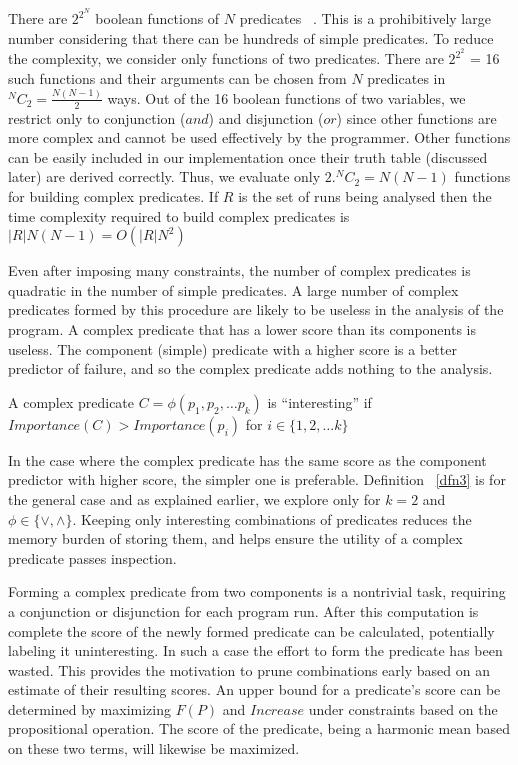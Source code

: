 There are $2^{2^N}$ boolean functions of $N$ predicates ~\cite{MathWorld:BoolFuncs}.  This is a prohibitively large number considering that there can be hundreds of simple predicates.  To reduce the complexity, we consider only functions of two predicates.  There are $2^{2^2}$ = 16 such functions and their arguments can be chosen from $N$ predicates in $^NC_2 = \frac{N(N-1)}{2}$ ways.  Out of the 16 boolean functions of two variables, we restrict only to conjunction ($and$) and disjunction ($or$) since other functions are more complex and cannot be used effectively by the programmer.  Other functions can be easily included in our implementation once their truth table (discussed later) are derived correctly.  Thus, we evaluate only $2. ^NC_2 = N(N-1)$ functions for building complex predicates.  If $R$ is the set of runs being analysed then the time complexity required to build complex predicates is $|R|N(N-1) = O(|R|N^2)$

Even after imposing many constraints, the number of complex predicates is quadratic in the number of simple predicates.  A large number of complex predicates formed by this procedure are likely to be useless in the analysis of the program.  A complex predicate that has a lower score than its components is useless.  The component (simple) predicate with a higher score is a better predictor of failure, and so the complex predicate adds nothing to the analysis.

\begin{defn}
\label{dfn3}
A complex predicate $C = \phi(p_1, p_2, \ldots p_k)$ is ``interesting'' if $Importance(C) > Importance(p_i)$ for $i \in \{1, 2, \ldots k\}$
\end{defn}

In the case where the complex predicate has the same score as the component predictor with higher score, the simpler one is preferable.  Definition ~\ref{dfn3} is for the general case and as explained earlier, we explore only for $k = 2$ and $\phi \in \{\vee, \wedge\}$.  Keeping only interesting combinations of predicates reduces the memory burden of storing them, and helps ensure the utility of a complex predicate passes inspection.

Forming a complex predicate from two components is a nontrivial task, requiring a conjunction or disjunction for each program run.  After this computation is complete the score of the newly formed predicate can be calculated, potentially labeling it uninteresting.  In such a case the effort to form the predicate has been wasted.  This provides the motivation to prune combinations early based on an estimate of their resulting scores.  An upper bound for a predicate's score can be determined by maximizing $F(P)$ and $Increase$ under constraints based on the propositional operation.  The score of the predicate, being a harmonic mean based on these two terms, will likewise be maximized.

